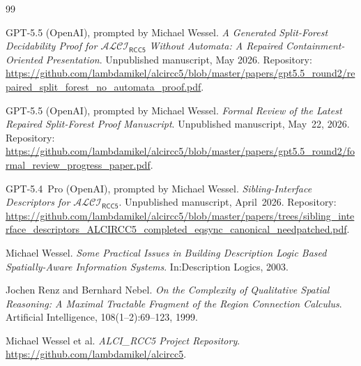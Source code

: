\documentclass[11pt]{article}
\theoremstyle{definition}
\theoremstyle{remark}
\newcommand{\ALCIRCC}[1]{\mathcal{ALCI}_{\mathsf{RCC#1}}}
\begin{document}
\begin{thebibliography}{99}

GPT-5.5 (OpenAI), prompted by Michael Wessel.
\emph{A Generated Split-Forest Decidability Proof for $\ALCIRCC{5}$
Without Automata: A Repaired Containment-Oriented Presentation}.
Unpublished manuscript, May 2026.  Repository:
\url{https://github.com/lambdamikel/alcircc5/blob/master/papers/gpt5.5_round2/repaired_split_forest_no_automata_proof.pdf}.

GPT-5.5 (OpenAI), prompted by Michael Wessel.
\emph{Formal Review of the Latest Repaired Split-Forest Proof
Manuscript}.  Unpublished manuscript, May~22, 2026.  Repository:
\url{https://github.com/lambdamikel/alcircc5/blob/master/papers/gpt5.5_round2/formal_review_progress_paper.pdf}.

GPT-5.4~Pro (OpenAI), prompted by Michael Wessel.
\emph{Sibling-Interface Descriptors for $\ALCIRCC{5}$}.  Unpublished
manuscript, April~2026.  Repository:
\url{https://github.com/lambdamikel/alcircc5/blob/master/papers/trees/sibling_interface_descriptors_ALCIRCC5_completed_eqsync_canonical_needpatched.pdf}.

Michael Wessel.
\emph{Some Practical Issues in Building Description Logic Based
Spatially-Aware Information Systems}.  In:\@ Description Logics, 2003.

Jochen Renz and Bernhard Nebel.
\emph{On the Complexity of Qualitative Spatial Reasoning: A Maximal
Tractable Fragment of the Region Connection Calculus}.  Artificial
Intelligence, 108(1--2):69--123, 1999.

Michael Wessel et al.
\emph{ALCI\_RCC5 Project Repository}.
\url{https://github.com/lambdamikel/alcircc5}.

\end{thebibliography}
\end{document}
